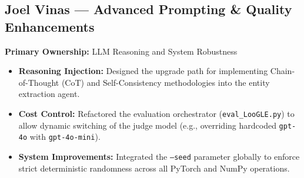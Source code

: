 \documentclass[11pt, letterpaper]{article}
\begin{document}
\subsection*{Joel Vinas — Advanced Prompting \& Quality Enhancements}
\textbf{Primary Ownership:} LLM Reasoning and System Robustness
\begin{itemize}[leftmargin=*]
    \setlength{\itemsep}{1pt}
    \item \textbf{Reasoning Injection:} Designed the upgrade path for implementing Chain-of-Thought (CoT) and Self-Consistency methodologies into the entity extraction agent.
    \item \textbf{Cost Control:} Refactored the evaluation orchestrator (\texttt{eval\_LooGLE.py}) to allow dynamic switching of the judge model (e.g., overriding hardcoded \texttt{gpt-4o} with \texttt{gpt-4o-mini}).
    \item \textbf{System Improvements:} Integrated the \texttt{--seed} parameter globally to enforce strict deterministic randomness across all PyTorch and NumPy operations.
\end{itemize}
\end{document}

